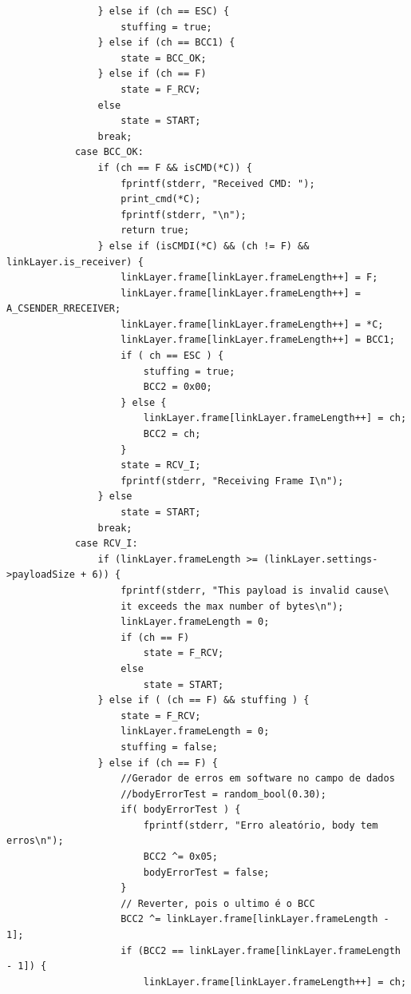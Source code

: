 \documentclass[a4paper]{article}
\begin{document}
\begin{verbatim}
                } else if (ch == ESC) {
                    stuffing = true;
                } else if (ch == BCC1) {
                    state = BCC_OK;
                } else if (ch == F)
                    state = F_RCV;
                else
                    state = START;
                break;
            case BCC_OK:
                if (ch == F && isCMD(*C)) {
                    fprintf(stderr, "Received CMD: ");
                    print_cmd(*C);
                    fprintf(stderr, "\n");
                    return true;
                } else if (isCMDI(*C) && (ch != F) && linkLayer.is_receiver) {
                    linkLayer.frame[linkLayer.frameLength++] = F;
                    linkLayer.frame[linkLayer.frameLength++] = A_CSENDER_RRECEIVER;
                    linkLayer.frame[linkLayer.frameLength++] = *C;
                    linkLayer.frame[linkLayer.frameLength++] = BCC1;
                    if ( ch == ESC ) {
                        stuffing = true;
                        BCC2 = 0x00;
                    } else {
                        linkLayer.frame[linkLayer.frameLength++] = ch;
                        BCC2 = ch;
                    }
                    state = RCV_I;
                    fprintf(stderr, "Receiving Frame I\n");
                } else
                    state = START;
                break;
            case RCV_I:
                if (linkLayer.frameLength >= (linkLayer.settings->payloadSize + 6)) {
                    fprintf(stderr, "This payload is invalid cause\
                    it exceeds the max number of bytes\n");
                    linkLayer.frameLength = 0;
                    if (ch == F)
                        state = F_RCV;
                    else
                        state = START;
                } else if ( (ch == F) && stuffing ) {
                    state = F_RCV;
                    linkLayer.frameLength = 0;
                    stuffing = false;
                } else if (ch == F) {
                    //Gerador de erros em software no campo de dados
                    //bodyErrorTest = random_bool(0.30);
                    if( bodyErrorTest ) {
                        fprintf(stderr, "Erro aleatório, body tem erros\n");
                        BCC2 ^= 0x05;
                        bodyErrorTest = false;
                    }
                    // Reverter, pois o ultimo é o BCC
                    BCC2 ^= linkLayer.frame[linkLayer.frameLength - 1];
                    if (BCC2 == linkLayer.frame[linkLayer.frameLength - 1]) {
                        linkLayer.frame[linkLayer.frameLength++] = ch;

\end{verbatim}
\end{document}
